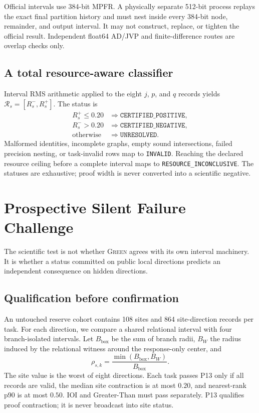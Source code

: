 \documentclass{article}
\newcommand{\green}{\textsc{Green}}
\begin{document}
Official intervals use 384-bit MPFR. A physically separate 512-bit process replays the exact final partition history and must nest inside every 384-bit node, remainder, and output interval. It may not construct, replace, or tighten the official result. Independent float64 AD/JVP and finite-difference routes are overlap checks only.

\subsection{A total resource-aware classifier}
Interval RMS arithmetic applied to the eight $j$, $p$, and $q$ records yields $\mathcal R_s=[R_s^-,R_s^+]$. The status is
\begin{equation}
\begin{aligned}
R_s^+\le0.20 &\Rightarrow \texttt{CERTIFIED\_POSITIVE},\\
R_s^->0.20 &\Rightarrow \texttt{CERTIFIED\_NEGATIVE},\\
\text{otherwise} &\Rightarrow \texttt{UNRESOLVED}.
\end{aligned}
\end{equation}
Malformed identities, incomplete graphs, empty sound intersections, failed precision nesting, or task-invalid rows map to \texttt{INVALID}. Reaching the declared resource ceiling before a complete interval maps to \texttt{RESOURCE\_INCONCLUSIVE}. The statuses are exhaustive; proof width is never converted into a scientific negative.

\section{Prospective Silent Failure Challenge}
\label{sec:protocol}

The scientific test is not whether \green{} agrees with its own interval machinery. It is whether a status committed on public local directions predicts an independent consequence on hidden directions.

\subsection{Qualification before confirmation}
An untouched reserve cohort contains 108 sites and 864 site-direction records per task. For each direction, we compare a shared relational interval with four branch-isolated intervals. Let $B_{\mathrm{box}}$ be the sum of branch radii, $B_W$ the radius induced by the relational witness around the response-only center, and
\begin{equation}
    \rho_{s,k}=\frac{\min(B_{\mathrm{box}},B_W)}{B_{\mathrm{box}}}.
\end{equation}
The site value is the worst of eight directions. Each task passes P13 only if all records are valid, the median site contraction is at most $0.20$, and nearest-rank p90 is at most $0.50$. IOI and Greater-Than must pass separately. P13 qualifies proof contraction; it is never broadcast into site status.
\end{document}
